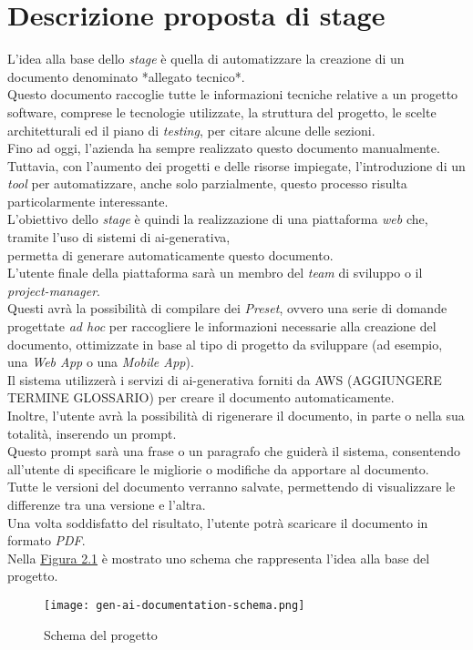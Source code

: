 \section{Descrizione proposta di stage}
\label{sez:descrizione-stage}

L'idea alla base dello \textit{stage} è quella di automatizzare la creazione di un documento denominato *allegato tecnico*.\\  
Questo documento raccoglie tutte le informazioni tecniche relative a un progetto software, comprese le tecnologie utilizzate,
la struttura del progetto, le scelte architetturali ed il piano di \textit{testing}, per citare alcune delle sezioni.\\  
Fino ad oggi, l'azienda ha sempre realizzato questo documento manualmente. Tuttavia, con l'aumento dei progetti e delle risorse impiegate,
l'introduzione di un \textit{tool} per automatizzare, anche solo parzialmente, questo processo risulta particolarmente interessante.\\  

\noindent L'obiettivo dello \textit{stage} è quindi la realizzazione di una piattaforma \textit{web} che, tramite l'uso di sistemi di \gls{ai-generativa},\\  
permetta di generare automaticamente questo documento.\\  
L'utente finale della piattaforma sarà un membro del \textit{team} di sviluppo o il \textit{project-manager}.\\  
Questi avrà la possibilità di compilare dei \textit{Preset}, ovvero una serie di domande progettate \textit{ad hoc}
per raccogliere le informazioni necessarie alla creazione del documento, ottimizzate in base al tipo di progetto da sviluppare (ad esempio, una \textit{Web App} o una \textit{Mobile App}).\\  
Il sistema utilizzerà i servizi di \gls{ai-generativa} forniti da AWS (AGGIUNGERE TERMINE GLOSSARIO) per creare il documento automaticamente.\\  

\noindent Inoltre, l'utente avrà la possibilità di rigenerare il documento, in parte o nella sua totalità, inserendo un \gls{prompt}.\\  
Questo \gls{prompt} sarà una frase o un paragrafo che guiderà il sistema, consentendo all'utente di specificare le migliorie o modifiche da apportare al documento.\\  
Tutte le versioni del documento verranno salvate, permettendo di visualizzare le differenze tra una versione e l'altra.\\  
Una volta soddisfatto del risultato, l'utente potrà scaricare il documento in formato \textit{PDF}.\\  
Nella {\hyperref[fig:project-schema]{Figura 2.1}} è mostrato uno schema che rappresenta l'idea alla base del progetto.\\  


\begin{figure}[H]
    \label{fig:project-schema}
    \centering
    \texttt{[image: gen-ai-documentation-schema.png]}
    \caption{Schema del progetto}
\end{figure}